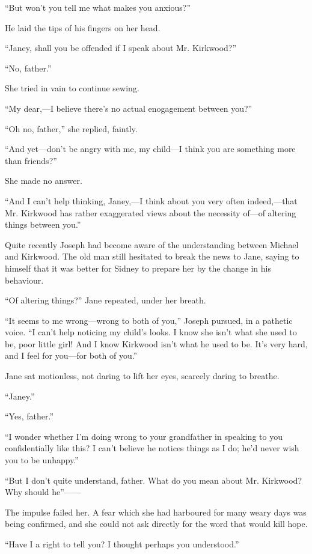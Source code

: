{}``But won't you tell me what makes you anxious?''

He laid the tips of his fingers on her head.

``Janey, shall you be offended if I speak about Mr. Kirkwood?''

``No, father.''

She tried in vain to continue sewing.

``My dear,---I believe there's no actual enogagement between you?''

``Oh no, father,'' she replied, faintly.

``And yet---don't be angry with me, my child---I think you are something
more than friends?''

She made no answer.

``And I can't help thinking, Janey,---I think about you very often
indeed,---that Mr. Kirkwood has rather exaggerated views about the
necessity of---of altering things between you.''

Quite recently Joseph had become aware of the understanding between
Michael and Kirkwood. The old man still hesitated to break the news to
Jane, saying to himself that it was better for Sidney to prepare her by
the change in his behaviour.

``Of altering things?'' Jane repeated, under her breath.

{}``It seems to me wrong---wrong to both of you,'' Joseph pursued, in a
pathetic voice. ``I can't help noticing my child's looks. I know she
isn't what she used to be, poor little girl! And I know Kirkwood isn't
what he used to be. It's very hard, and I feel for you---for both of
you.''

Jane sat motionless, not daring to lift her eyes, scarcely daring to
breathe.

``Janey.''

``Yes, father.''

``I wonder whether I'm doing wrong to your grandfather in speaking to
you confidentially like this? I can't believe he notices things as I do;
he'd never wish you to be unhappy.''

``But I don't quite understand, father. What do you mean about Mr.
Kirkwood? Why should he''{{------}}

The impulse failed her. A fear which she had harboured for many weary
days was being confirmed, and she could not ask directly for the word
that would kill hope.

``Have I a right to tell you? I thought perhaps you understood.''

